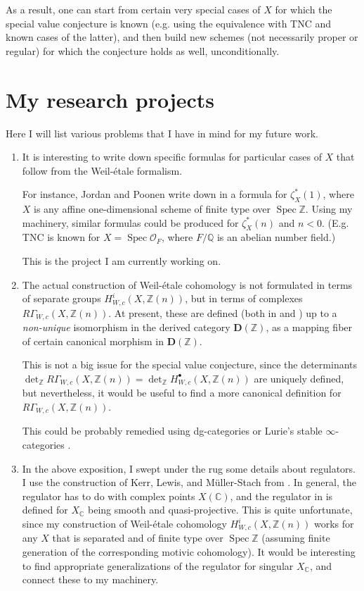 \documentclass{article}
\DeclareMathOperator{\Spec}{Spec}
\newcommand{\ZZ}{\mathbb{Z}}
\newcommand{\QQ}{\mathbb{Q}}
\newcommand{\CC}{\mathbb{C}}
\begin{document}
As a result, one can start from certain very special cases of $X$ for which the
special value conjecture is known (e.g. using the equivalence with TNC and known
cases of the latter), and then build new schemes (not necessarily proper or
regular) for which the conjecture holds as well, unconditionally.

\section{My research projects}

Here I will list various problems that I have in mind for my future work.

\begin{enumerate}
\item It is interesting to write down specific formulas for particular cases of
  $X$ that follow from the Weil-étale formalism.

  For instance, Jordan and Poonen write down in \cite{Jordan-Poonen-2020} a
  formula for $\zeta_X^* (1)$, where $X$ is any affine one-dimensional scheme of
  finite type over $\Spec \ZZ$. Using my machinery, similar formulas could be
  produced for $\zeta_X^* (n)$ and $n < 0$. (E.g. TNC is known for
  $X = \Spec \mathcal{O}_F$, where $F/\QQ$ is an abelian number field.)

  This is the project I am currently working on.

\item The actual construction of Weil-étale cohomology is not formulated in
  terms of separate groups $H^i_{W,c} (X, \ZZ (n))$, but in terms of complexes
  $R\Gamma_{W,c} (X, \ZZ (n))$. At present, these are defined (both in
  \cite{Flach-Morin-2018} and \cite{Weil-etale-preprint-1}) up to a
  \emph{non-unique} isomorphism in the derived category $\mathbf{D} (\ZZ)$,
  as a mapping fiber of certain canonical morphism in $\mathbf{D} (\ZZ)$.

  This is not a big issue for the special value conjecture, since the
  determinants
  $\det_\ZZ R\Gamma_{W,c} (X, \ZZ (n)) = \det_\ZZ H^\bullet_{W,c} (X, \ZZ(n))$
  are uniquely defined, but nevertheless, it would be useful to find a more
  canonical definition for $R\Gamma_{W,c} (X, \ZZ (n))$.

  This could be probably remedied using dg-categories \cite{Toen-2011} or
  Lurie's stable $\infty$-categories \cite{Lurie-stable-oo}.

\item In the above exposition, I swept under the rug some details about
  regulators. I use the construction of Kerr, Lewis, and Müller-Stach from
  \cite{KLMS}. In general, the regulator has to do with complex points
  $X (\CC)$, and the regulator in \cite{KLMS} is defined for $X_\CC$ being
  smooth and quasi-projective. This is quite unfortunate, since my construction
  of Weil-étale cohomology $H^i_{W,c} (X, \ZZ (n))$ works for any $X$ that is
  separated and of finite type over $\Spec \ZZ$ (assuming finite generation of
  the corresponding motivic cohomology). It would be interesting to find
  appropriate generalizations of the regulator for singular $X_\CC$, and connect
  these to my machinery.


\end{enumerate}
\end{document}
